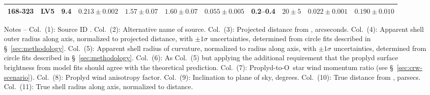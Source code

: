 \begin{table}
\begin{tabular}{llrllllrlll}
168-323  & LV5 & 9.4 & \(0.213 \pm 0.002\) & \(1.57 \pm 0.07\) & \(1.60 \pm 0.07\) & \(0.055 \pm 0.005\) & 0.2--0.4 & \(20 \pm 5\) & \(0.022 \pm 0.001\) & \(0.190 \pm 0.010\)\\
\bottomrule
\end{tabular}
\begin{minipage}{0.95\linewidth}
  Notes --
%
  Col.~(1): Source ID \citep{ODell:1994a}.
%
  Col.~(2): Alternative name of source.
% 
  Col.~(3): Projected distance from \thC{}, arcseconds.
%
  Col.~(4): Apparent shell outer radius along axis, normalized to
  projected distance, with \(\pm 1\sigma\) uncertainties, determined
  from circle fits described in \S~\ref{sec:methodology}.
% 
  Col.~(5): Apparent shell radius of curvature, normalized to radius
  along axis, with \(\pm 1\sigma\) uncertainties, determined from
  circle fits described in \S~\ref{sec:methodology}.
% 
  Col.~(6): As Col.~(5) but applying the additional requirement that
  the proplyd surface brightness from model fits should agree with the
  theoretical prediction.
%
  Col.~(7): Proplyd-to-O~star wind momentum ratio (see \S~\ref{sec:crw-scenario}). 
% 
  Col.~(8): Proplyd wind anisotropy factor.
% 
  Col.~(9): Inclination to plane of sky, degrees.
% 
  Col.~(10): True distance from \thC{}, parsecs.
%
  Col.~(11): True shell radius along axis, normalized to distance.

\end{minipage}
\end{table}

%



